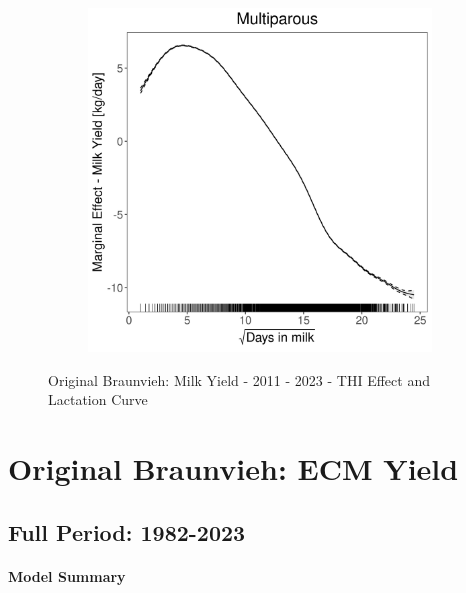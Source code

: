 \begin{figure}[H]
\begin{subfigure}[b]{0.45\textwidth}
    \end{subfigure}
    \hspace{0.05\textwidth} %
    \begin{subfigure}[b]{0.45\textwidth}
        \centering
        \includegraphics[width=\textwidth]{thesis/figures/models/milk/after2010/ob_milk_after2010/ob_milk_after2010_marginal_dim_milk_multi.png}
    \end{subfigure}
    \caption[]{Original Braunvieh: Milk Yield - 2011 - 2023 - THI Effect and Lactation Curve}
    \label{fig:main}
\end{figure}

\section{Original Braunvieh: ECM Yield}
\subsection{Full Period: 1982-2023}\label{model:ob_ecm_full}
\paragraph{Model Summary} \quad \\


